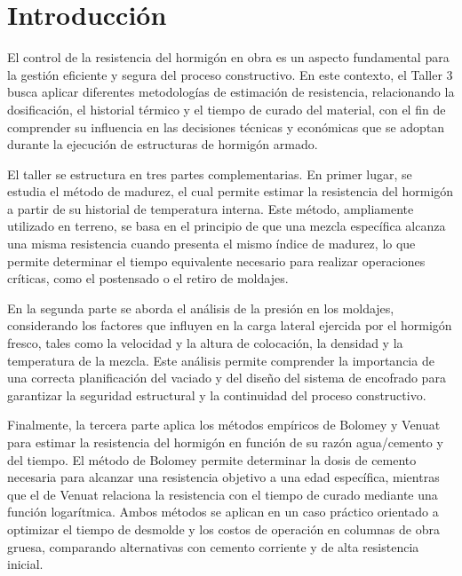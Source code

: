 \section{Introducción}

El control de la resistencia del hormigón en obra es un aspecto fundamental para la gestión eficiente y segura del proceso constructivo. En este contexto, el Taller 3 busca aplicar diferentes metodologías de estimación de resistencia, relacionando la dosificación, el historial térmico y el tiempo de curado del material, con el fin de comprender su influencia en las decisiones técnicas y económicas que se adoptan durante la ejecución de estructuras de hormigón armado.

El taller se estructura en tres partes complementarias. En primer lugar, se estudia el método de madurez, el cual permite estimar la resistencia del hormigón a partir de su historial de temperatura interna. Este método, ampliamente utilizado en terreno, se basa en el principio de que una mezcla específica alcanza una misma resistencia cuando presenta el mismo índice de madurez, lo que permite determinar el tiempo equivalente necesario para realizar operaciones críticas, como el postensado o el retiro de moldajes.

En la segunda parte se aborda el análisis de la presión en los moldajes, considerando los factores que influyen en la carga lateral ejercida por el hormigón fresco, tales como la velocidad y la altura de colocación, la densidad y la temperatura de la mezcla. Este análisis permite comprender la importancia de una correcta planificación del vaciado y del diseño del sistema de encofrado para garantizar la seguridad estructural y la continuidad del proceso constructivo.

Finalmente, la tercera parte aplica los métodos empíricos de Bolomey y Venuat para estimar la resistencia del hormigón en función de su razón agua/cemento y del tiempo. El método de Bolomey permite determinar la dosis de cemento necesaria para alcanzar una resistencia objetivo a una edad específica, mientras que el de Venuat relaciona la resistencia con el tiempo de curado mediante una función logarítmica. Ambos métodos se aplican en un caso práctico orientado a optimizar el tiempo de desmolde y los costos de operación en columnas de obra gruesa, comparando alternativas con cemento corriente y de alta resistencia inicial.
